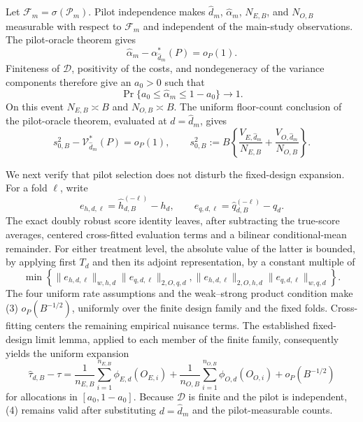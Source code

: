 Let \(\mathcal F_m=\sigma(\mathcal P_m)\).  Pilot independence makes \(\widehat d_m\), \(\widehat\alpha_m\), \(N_{E,B}\), and \(N_{O,B}\) measurable with respect to \(\mathcal F_m\) and independent of the main-study observations.  The pilot-oracle theorem gives
\[
 \widehat\alpha_m-\alpha_{\widehat d_m}^*(P)=o_P(1).
\]
Finiteness of \(\mathcal D\), positivity of the costs, and nondegeneracy of the variance components therefore give an \(a_0>0\) such that
\[
 \Pr\{a_0\le\widehat\alpha_m\le1-a_0\}\longrightarrow1. \tag{1}
\]
On this event \(N_{E,B}\asymp B\) and \(N_{O,B}\asymp B\).  The uniform floor-count conclusion of the pilot-oracle theorem, evaluated at \(d=\widehat d_m\), gives
\[
 s_{0,B}^2-\mathcal V_{\widehat d_m}^*(P)=o_P(1),\qquad
 s_{0,B}^2:=B\left\{\frac{V_{E,\widehat d_m}}{N_{E,B}}
 +\frac{V_{O,\widehat d_m}}{N_{O,B}}\right\}. \tag{2}
\]

We next verify that pilot selection does not disturb the fixed-design expansion.  For a fold \(\ell\), write
\[
 e_{h,d,\ell}=\widehat h_{d,B}^{(-\ell)}-h_d,
 \qquad e_{q,d,\ell}=\widehat q_{d,B}^{(-\ell)}-q_d.
\]
The exact doubly robust score identity leaves, after subtracting the true-score averages, centered cross-fitted evaluation terms and a bilinear conditional-mean remainder.  For either treatment level, the absolute value of the latter is bounded, by applying first \(T_d\) and then its adjoint representation, by a constant multiple of
\[
 \min\left\{
 \|e_{h,d,\ell}\|_{w,h,d}\|e_{q,d,\ell}\|_{2,O,q,d},
 \|e_{h,d,\ell}\|_{2,O,h,d}\|e_{q,d,\ell}\|_{w,q,d}
 \right\}. \tag{3}
\]
The four uniform rate assumptions and the weak--strong product condition make (3) \(o_P(B^{-1/2})\), uniformly over the finite design family and the fixed folds.  Cross-fitting centers the remaining empirical nuisance terms.  The established fixed-design limit lemma, applied to each member of the finite family, consequently yields the uniform expansion
\[
 \widehat\tau_{d,B}-\tau
 =\frac1{n_{E,B}}\sum_{i=1}^{n_{E,B}}\phi_{E,d}(O_{E,i})
 +\frac1{n_{O,B}}\sum_{i=1}^{n_{O,B}}\phi_{O,d}(O_{O,i})
 +o_P(B^{-1/2}) \tag{4}
\]
for allocations in \([a_0,1-a_0]\).  Because \(\mathcal D\) is finite and the pilot is independent, (4) remains valid after substituting \(d=\widehat d_m\) and the pilot-measurable counts.

